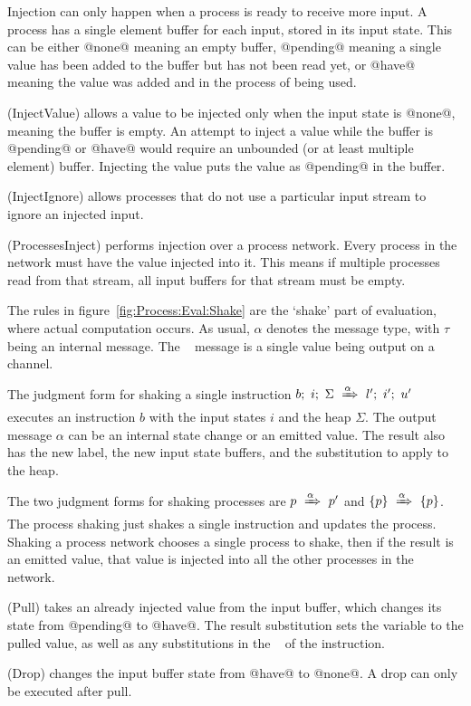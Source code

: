 Injection can only happen when a process is ready to receive more input.
A process has a single element buffer for each input, stored in its input state.
This can be either @none@ meaning an empty buffer, @pending@ meaning a single value has been added to the buffer but has not been read yet, or @have@ meaning the value was added and in the process of being used.

(InjectValue) allows a value to be injected only when the input state is @none@, meaning the buffer is empty.
An attempt to inject a value while the buffer is @pending@ or @have@ would require an unbounded (or at least multiple element) buffer.
Injecting the value puts the value as @pending@ in the buffer.

(InjectIgnore) allows processes that do not use a particular input stream to ignore an injected input.

(ProcessesInject) performs injection over a process network.
Every process in the network must have the value injected into it.
This means if multiple processes read from that stream, all input buffers for that stream must be empty.

The rules in figure~\ref{fig:Process:Eval:Shake} are the `shake' part of evaluation, where actual computation occurs. 
As usual, $\alpha$ denotes the message type, with $\tau$ being an internal message. The \Push~ message is a single value being output on a channel.


The judgment form for shaking a single instruction $b;~i;~\Sigma~\xRightarrow{\alpha}~l';~i';~u'$
executes an instruction $b$ with the input states $i$ and the heap $\Sigma$.
The output message $\alpha$ can be an internal state change or an emitted value.
The result also has the new label, the new input state buffers, and the substitution to apply to the heap.

The two judgment forms for shaking processes are $p~\xRightarrow{\alpha}~p'$ and $\{ p \}~\xRightarrow{\alpha}~\{ p \}$.
The process shaking just shakes a single instruction and updates the process.
Shaking a process network chooses a single process to shake, then if the result is an emitted value, that value is injected into all the other processes in the network.

(Pull) takes an already injected value from the input buffer, which changes its state from @pending@ to @have@.
The result substitution sets the variable to the pulled value, as well as any substitutions in the \Next~ of the instruction.

(Drop) changes the input buffer state from @have@ to @none@. A drop can only be executed after pull.

